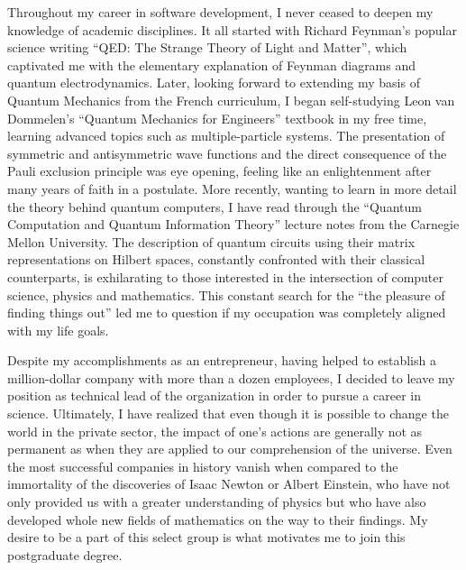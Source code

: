 \documentclass[10pt]{article}
\begin{document}
Throughout my career in software development, I never ceased to deepen my knowledge of academic disciplines. It all started with Richard Feynman's popular science writing ``QED: The Strange Theory of Light and Matter'', which captivated me with the elementary explanation of Feynman diagrams and quantum electrodynamics. Later, looking forward to extending my basis of Quantum Mechanics from the French curriculum, I began self-studying Leon van Dommelen's ``Quantum Mechanics for Engineers'' textbook in my free time, learning advanced topics such as multiple-particle systems. The presentation of symmetric and antisymmetric wave functions and the direct consequence of the Pauli exclusion principle was eye opening, feeling like an enlightenment after many years of faith in a postulate. More recently, wanting to learn in more detail the theory behind quantum computers, I have read through the ``Quantum Computation and Quantum Information Theory'' lecture notes from the Carnegie Mellon University. The description of quantum circuits using their matrix representations on Hilbert spaces, constantly confronted with their classical counterparts, is exhilarating to those interested in the intersection of computer science, physics and mathematics. This constant search for the ``the pleasure of finding things out'' led me to question if my occupation was completely aligned with my life goals.

Despite my accomplishments as an entrepreneur, having helped to establish a million-dollar company with more than a dozen employees, I decided to leave my position as technical lead of the organization in order to pursue a career in science. Ultimately, I have realized that even though it is possible to change the world in the private sector, the impact of one's actions are generally not as permanent as when they are applied to our comprehension of the universe. Even the most successful companies in history vanish when compared to the immortality of the discoveries of Isaac Newton or Albert Einstein, who have not only provided us with a greater understanding of physics but who have also developed whole new fields of mathematics on the way to their findings. My desire to be a part of this select group is what motivates me to join this postgraduate degree.
\end{document}
